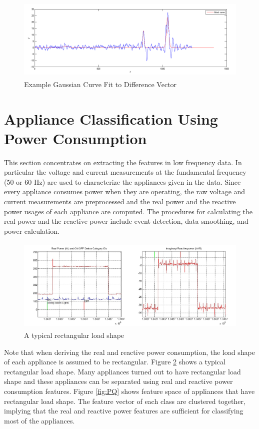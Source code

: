 \documentclass[11pt, letterpaper]{article}
\begin{document}
\begin{figure}[H]
\centering
\includegraphics[height=4cm]{fig/gaussfit.png}
\caption{Example Gaussian Curve Fit to Difference Vector}\label{gfit}
\end{figure}



\section{Appliance Classification Using Power Consumption}\label{lfapproach}
This section concentrates on extracting the features in low frequency data.  In particular the voltage and current measurements at the fundamental frequency (50 or 60 Hz) are used to characterize the appliances given in the data.  Since every appliance consumes power when they are operating, the raw voltage and current measurements are preprocessed and the real power and the reactive power usages of each appliance are computed.  The procedures for calculating the real power and the reactive power include event detection, data smoothing, and power calculation.

\begin{figure}[h]
\centering
\includegraphics[height=4.5cm]{fig/rec.jpg}
\caption{A typical rectangular load shape}
\label{fig:rec}
\end{figure}

Note that when deriving the real and reactive power consumption, the load shape of each appliance is assumed to be rectangular.  Figure \ref{fig:rec} shows a typical rectangular load shape.  Many appliances turned out to have rectangular load shape and these appliances can be separated using real and reactive power consumption features.  Figure \ref{fig:PQ} shows feature space of appliances that have rectangular load shape.  The feature vector of each class are clustered together, implying that the real and reactive power features are sufficient for classifying most of the appliances.
\end{document}
